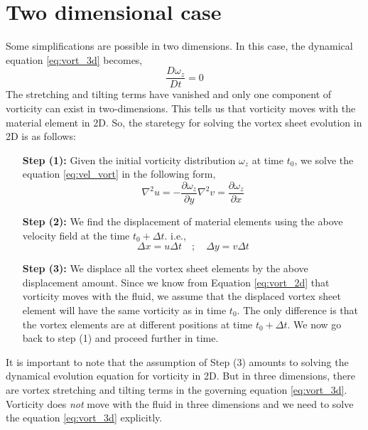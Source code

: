 \documentclass{article}
\begin{document}
\section{Two dimensional case}
Some simplifications are possible in two dimensions. In this case, the dynamical equation \eqref{eq:vort_3d} becomes,
\begin{equation}\label{eq:vort_2d}
\frac{D\omega_z}{Dt}=0
\end{equation}
The stretching and tilting terms have vanished and only one component of vorticity can exist in two-dimensions. This tells us that vorticity moves with the material element in 2D. So, the staretegy for solving the vortex sheet evolution in 2D is as follows:
\begin{itemize}
\item[\textbf{Step (1):}] Given the initial vorticity distribution $\omega_z$ at time $t_0$, we solve the equation \eqref{eq:vel_vort} in the following form,
\begin{subequations}
\begin{equation}
\nabla^2 u = -\frac{\partial \omega_z}{\partial y} 
\end{equation}
\begin{equation}
\nabla^2 v = \frac{\partial \omega_z}{\partial x} 
\end{equation}
\end{subequations}
\item[\textbf{Step (2):}] We find the displacement of material elements using the above velocity field at the time $t_0 + \Delta t$. i.e.,
\begin{equation}
\Delta x = u \Delta t \quad ; \quad \Delta y = v \Delta t
\end{equation}
\item[\textbf{Step (3):}] We displace all the vortex sheet elements by the above displacement amount. Since we know from Equation \eqref{eq:vort_2d} that vorticity moves with the fluid, we assume that the displaced vortex sheet element will have the same vorticity as in time $t_0$. The only difference is that the vortex elements are at different positions at time $t_0 +\Delta t$. We now go back to step (1) and proceed further in time. 
\end{itemize}

It is important to note that the assumption of Step (3) amounts to solving the dynamical evolution equation for vorticity in 2D. But in three dimensions, there are vortex stretching and tilting terms in the governing equation \eqref{eq:vort_3d}. Vorticity does \textit{not} move with the fluid in three dimensions and we need to solve the equation \eqref{eq:vort_3d} explicitly. 
\end{document}
